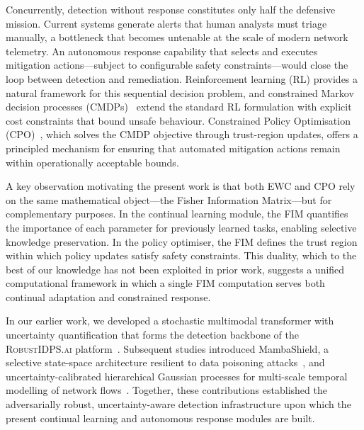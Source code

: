 \documentclass[journal]{IEEEtran}
\theoremstyle{definition}
\theoremstyle{remark}
\newcommand{\RobustIDPS}{\textsc{RobustIDPS.ai}}
\begin{document}
Concurrently, detection without response constitutes only half the defensive mission. Current systems generate alerts that human analysts must triage manually, a bottleneck that becomes untenable at the scale of modern network telemetry. An autonomous response capability that selects and executes mitigation actions---subject to configurable safety constraints---would close the loop between detection and remediation. Reinforcement learning (RL) provides a natural framework for this sequential decision problem, and constrained Markov decision processes (CMDPs)~\cite{altman1999constrained} extend the standard RL formulation with explicit cost constraints that bound unsafe behaviour. Constrained Policy Optimisation (CPO)~\cite{achiam2017cpo}, which solves the CMDP objective through trust-region updates, offers a principled mechanism for ensuring that automated mitigation actions remain within operationally acceptable bounds.

A key observation motivating the present work is that both EWC and CPO rely on the same mathematical object---the Fisher Information Matrix---but for complementary purposes. In the continual learning module, the FIM quantifies the importance of each parameter for previously learned tasks, enabling selective knowledge preservation. In the policy optimiser, the FIM defines the trust region within which policy updates satisfy safety constraints. This duality, which to the best of our knowledge has not been exploited in prior work, suggests a unified computational framework in which a single FIM computation serves both continual adaptation and constrained response.

In our earlier work, we developed a stochastic multimodal transformer with uncertainty quantification that forms the detection backbone of the \RobustIDPS{} platform~\cite{anaedevha2026stochastic}. Subsequent studies introduced MambaShield, a selective state-space architecture resilient to data poisoning attacks~\cite{anaedevha2026mambashield}, and uncertainty-calibrated hierarchical Gaussian processes for multi-scale temporal modelling of network flows~\cite{anaedevha2026gp}. Together, these contributions established the adversarially robust, uncertainty-aware detection infrastructure upon which the present continual learning and autonomous response modules are built.
\end{document}
